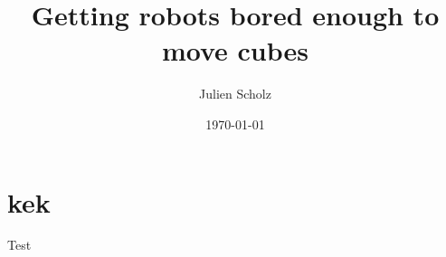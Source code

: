 \documentclass{article}
\title{Getting robots bored enough to move cubes}
\author{Julien Scholz}
\date{\today}
\begin{document}


\tableofcontents

\section{kek}
Test
\end{document}
